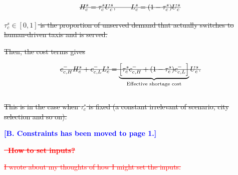 \documentclass[10pt,a4paper]{article}
\newcommand{\hd}[1]{\par\vspace{8pt}\textbf{#1}\par\vspace{3pt}}
\newcommand{\note}{\textreferencemark\ }
\begin{document}
\[
\mbox{\sout{\(
\displaystyle H_c^s=\tau_c^s U_c^s,\qquad L_c^s=(1-\tau_c^s)U_c^s
\)}} 
\]

\sout{
$\tau_c^s\in[0,1]$ is the proportion of unserved demand that actually switches to human-driven taxis and is served.
}
\par
\sout{
Then, the cost terms gives
}

\[
\mbox{\sout{\(
\displaystyle
c_{c,H}^-H_c^s+c_{c,L}^-L_c^s
=\underbrace{\left[\tau_c^s c_{c,H}^-+(1-\tau_c^s)c_{c,L}^-\right]}_{\text{Effective shortage cost}}U_c^s.
\)}}
\] \\

\sout{
This is in the case when $\tau_c^s$ is fixed (a constant irrelevant of scenario, city selection and so on).
}

\par
\endgroup

\textcolor{blue}{\textbf{[B. Constraints has been moved to page 1.]}
}

\hd{\textcolor{red}{\sout{\note How to set inputs?}}}
\textcolor{red}{\sout{I wrote about my thoughts of how I might set the inputs.}}
\end{document}
